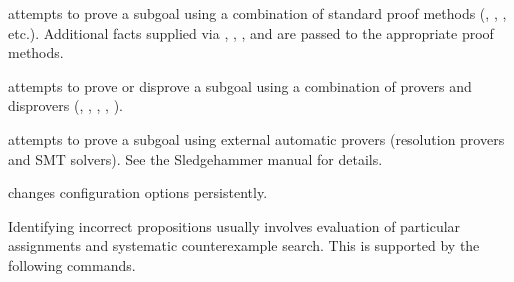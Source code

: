 \begin{isabellebody}
\begin{isamarkuptext}
\begin{description}
  \item \hyperlink{command.HOL.try-methods}{\mbox{}} attempts to prove a subgoal
  using a combination of standard proof methods (\hyperlink{method.auto}{\mbox{}},
  \hyperlink{method.simp}{\mbox{}}, \hyperlink{method.blast}{\mbox{}}, etc.).  Additional facts supplied
  via , , , and  are passed to the appropriate proof methods.

  \item \hyperlink{command.HOL.try}{\mbox{}} attempts to prove or disprove a subgoal
  using a combination of provers and disprovers (\hyperlink{command.HOL.solve-direct}{\mbox{}}, \hyperlink{command.HOL.quickcheck}{\mbox{}}, \hyperlink{command.HOL.try-methods}{\mbox{}}, \hyperlink{command.HOL.sledgehammer}{\mbox{}}, \hyperlink{command.HOL.nitpick}{\mbox{}}).

  \item \hyperlink{command.HOL.sledgehammer}{\mbox{}} attempts to prove a subgoal
  using external automatic provers (resolution provers and SMT
  solvers). See the Sledgehammer manual \cite{isabelle-sledgehammer}
  for details.

  \item \hyperlink{command.HOL.sledgehammer-params}{\mbox{}} changes \hyperlink{command.HOL.sledgehammer}{\mbox{}} configuration options persistently.

  \end{description}%
\end{isamarkuptext}%
\isamarkuptrue%
%
\isamarkuptrue%
%
\begin{isamarkuptext}%
Identifying incorrect propositions usually involves evaluation of
  particular assignments and systematic counterexample search.  This
  is supported by the following commands.


\end{isamarkuptext}
\end{isabellebody}
